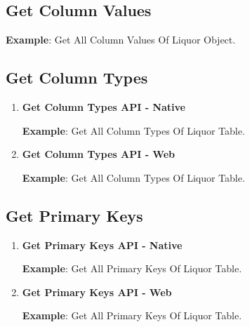 	\subsection{Get Column Values}
	

				\par
				\textbf{Example}: Get All Column Values Of Liquor Object.
					


	\subsection{Get Column Types}
	
		\begin{enumerate}

			\item \small \textbf{Get Column Types API - Native}
				

				\par
				\textbf{Example}: Get All Column Types Of Liquor Table.
					

			\item \small \textbf{Get Column Types API - Web}
				

				\par
				\textbf{Example}: Get All Column Types Of Liquor Table.
					

		\end{enumerate}



	\subsection{Get Primary Keys}
		
		\begin{enumerate}

			\item \small \textbf{Get Primary Keys API - Native}
				

				\par
				\textbf{Example}: Get All Primary Keys Of Liquor Table.
					

			\item \small \textbf{Get Primary Keys API - Web}
				

				\par
				\textbf{Example}: Get All Primary Keys Of Liquor Table.
					
	
		\end{enumerate}



